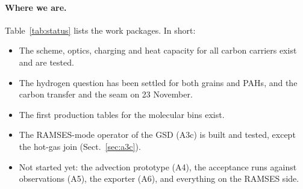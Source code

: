 \documentclass[11pt,a4paper]{article}
\begin{document}
\paragraph{Where we are.} Table~\ref{tab:status} lists the work packages. In short:
\begin{itemize}
\item The scheme, optics, charging and heat capacity for all carbon carriers exist and are tested.
\item The hydrogen question has been settled for both grains and PAHs, and the carbon transfer and the seam on 23
  November.
\item The first production tables for the molecular bins exist.
\item The RAMSES-mode operator of the GSD (A3c) is built and tested, except the hot-gas join (Sect.~\ref{sec:a3c}).
\item Not started yet: the advection prototype (A4), the acceptance runs against observations (A5), the exporter
  (A6), and everything on the RAMSES side.
\end{itemize}
\end{document}

